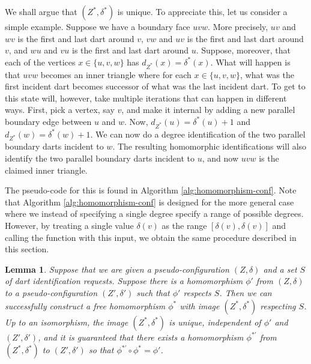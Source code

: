 \documentclass[10pt,a4paper]{article}
\newtheorem{lem}[thm]{Lemma}
\begin{document}
We shall argue that $(Z^*,\delta^*)$ is unique. To appreciate this, let us consider a simple example. Suppose
we have a boundary face $uvw$. More precisely, $uv$ and $wv$ is the first and last dart around $v$, 
$vw$ and $uv$ is the first and last dart around $v$,
and  $wu$ and $vu$ is the first and last dart around $u$. Suppose, moreover, that each of the vertices $x\in\{u,v,w\}$ has $d_{Z^*}(x)=\delta^*(x)$. What will
happen is that $uvw$ becomes
an inner triangle where
for each $x\in\{u,v,w\}$,
what was the first incident dart becomes successor of what was the last incident dart. To get to this state  will, however, take multiple iterations that can happen in different ways. First, pick
a vertex, say $v$, and make it
internal by adding a new
parallel boundary edge between $u$ and $w$. Now,
$d_{Z^*}(u)=\delta^*(u)+1$
and $d_{Z^*}(w)=\delta^*(w)+1$. We can now do a degree identification of the two parallel boundary darts incident to $w$. The resulting homomorphic identifications will also identify the two parallel boundary darts incident to $u$, and now $uvw$ is the claimed inner triangle.

The pseudo-code for this is found in Algorithm \ref{alg:homomorphism-conf}. Note that Algorithm \ref{alg:homomorphism-conf} is designed for the more general case
where we instead of specifying a single degree specify a range of
possible degrees. 
However, by treating a single value $\delta(v)$ as the range $[\delta(v), \delta(v)]$ and calling the function with this input, we obtain the same procedure described in this section.


 \begin{lem}\label{lem:free-homo-conf}
Suppose that we are given a pseudo-configuration $(Z,\delta)$ and a set $S$ of dart identification requests. Suppose there is a homomorphism $\phi'$ from $(Z,\delta)$ to a pseudo-configuration $(Z',\delta')$ such that $\phi'$ respects $S$.
Then we can 
successfully construct a free homomorphism $\phi^*$ with image $(Z^*,\delta^*)$ respecting $S$. Up to an isomorphism,
the image $(Z^*,\delta^*)$ 
is unique, independent of  $\phi'$ and $(Z',\delta')$, and it is guaranteed that there
exists a homomorphism $\phi^{*\prime}$ from $(Z^*,\delta^*)$ to $(Z',\delta')$ so that 
$\phi^{*\prime}\circ\phi^*=\phi'$.
\end{lem}
\end{document}
